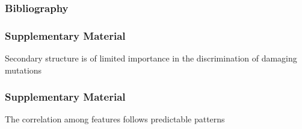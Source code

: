 \documentclass[10pt, british, luatex]{beamer}
\begin{document}
\appendix%
\begin{frame}[allowframebreaks]
	\frametitle{Bibliography}
	\printbibliography{}%
\end{frame}

\begin{frame}
	\frametitle{Supplementary Material}
	Secondary structure is of limited importance in the discrimination of damaging mutations\\[1ex]
	{%
	\centering%
	\let\bfseries\sbseries%
	
	}
\end{frame}

\begin{frame}
	\frametitle{Supplementary Material}
	The correlation among features follows predictable patterns\\[1ex]
	{%
	\centering%
	\let\bfseries\sbseries%
	
	}
\end{frame}
\end{document}
